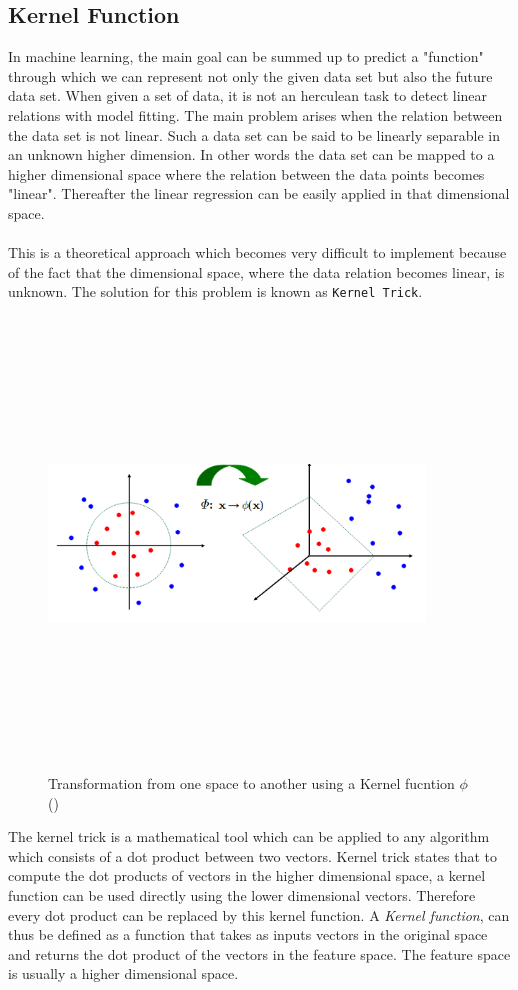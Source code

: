 \subsection{Kernel Function}
In machine learning, the main goal can be summed up to predict a "function" through which we can represent not only the given data set but also the future data set. When given a set of data, it is not an herculean task to detect linear relations with model fitting. The main problem arises when the relation between the data set is not linear. Such a data set can be said to be linearly separable in an unknown higher dimension. In other words the data set can be mapped to a higher dimensional space where the relation between the data points becomes "linear". Thereafter the linear regression can be easily applied in that dimensional space.\\\\
This is a theoretical approach which becomes very difficult to implement because of the fact that the dimensional space, where the data relation becomes linear, is unknown. The solution for this problem is known as \texttt{Kernel Trick}.
\begin{figure}[H]
	\centering
	\includegraphics[width=10cm,height=12cm,keepaspectratio]{files/kernel.png}
	\caption{Transformation from one space to another using a Kernel fucntion $\phi$ (\cite{lecKernel})}
	\label{fig:kernel}
\end{figure}
The kernel trick is a mathematical tool which can be applied to any algorithm which consists of a dot product between two vectors. Kernel trick states that to compute the dot products of vectors in the higher dimensional space, a kernel function can be used directly using the lower dimensional vectors. Therefore every dot product can be replaced by this kernel function. A \textit{Kernel function}, can thus be defined as a function that takes as inputs vectors in the original space and returns the dot product of the vectors in the feature space. The feature space is usually a higher dimensional space.\\
